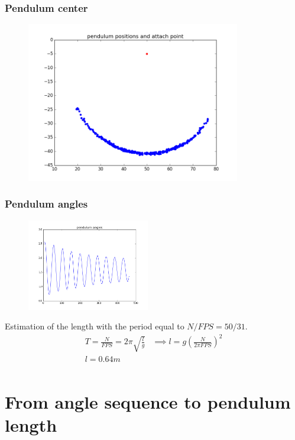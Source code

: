 \documentclass{beamer}
\begin{document}
\begin{frame}
  \frametitle{Pendulum center}
  \begin{figure}
    \includegraphics[height=7cm]{pendulum_positions_with_center.png}
  \end{figure}
\end{frame}

\begin{frame}
  \frametitle{Pendulum angles}
  \begin{figure}
    \includegraphics[height=4cm]{pendulum_angles.png}
  \end{figure}
  Estimation of the length with the period equal to $N / FPS = 50 / 31$.
  \begin{align*}
    T = \frac{N}{FPS} = 2 \pi \sqrt{\frac{l}{g}} &\implies l = g \left( \frac{N}{2 \pi FPS} \right)^2\\
    l  = 0.64m &\\
  \end{align*}
\end{frame}


\section{From angle sequence to pendulum length}
\end{document}
